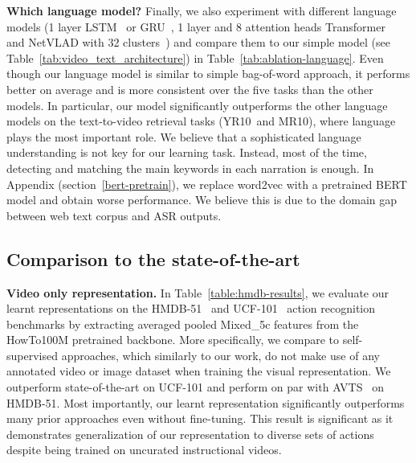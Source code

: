 \documentclass[10pt,twocolumn,letterpaper]{article}
\newcommand{\rYC}{YR10}
\newcommand{\rMSRVTT}{MR10}
\begin{document}
\noindent
\textbf{Which language model?}
Finally, we also experiment with different language models (1 layer LSTM~\cite{hochreiter97lstm} or GRU~\cite{cho11GRU}, 1 layer and 8 attention heads Transformer~\cite{vaswani2017attention} and NetVLAD with 32 clusters~\cite{arandjelovic16netvlad}) and compare them to our simple model (see Table~\ref{tab:video_text_architecture}) in Table~\ref{tab:ablation-language}.
Even though our language model is similar to simple bag-of-word approach, it performs better on average and is more consistent over the five tasks than the other models.
In particular, our model significantly outperforms the other language models on the text-to-video retrieval tasks (\rYC \ and \rMSRVTT), where language plays the most important role.
We believe that a sophisticated language understanding is not key for our learning task.
Instead, most of the time, detecting and matching the main keywords in each narration is enough.
In Appendix (section~\ref{bert-pretrain}), we replace word2vec with a pretrained BERT model and obtain worse performance. We believe this is due to the domain gap between web text corpus and ASR outputs.



\subsection{Comparison to the state-of-the-art}
\label{subsec:benchmark}

\noindent
\textbf{Video only representation.}
In Table~\ref{table:hmdb-results}, we evaluate our learnt representations on the \mbox{HMDB-51}~\cite{kuehne2011hmdb} and UCF-101~\cite{soomro2012} action recognition benchmarks by extracting averaged pooled Mixed\_5c features from the HowTo100M pretrained backbone.
More specifically, we compare to self-supervised approaches, which similarly to our work, do not make use of any annotated video or image dataset when training the visual representation.
We outperform state-of-the-art on UCF-101 and perform on par with AVTS~\cite{korbar2018cooperative} on HMDB-51.
Most importantly, our learnt representation significantly outperforms many prior approaches even without fine-tuning.
This result is significant as it demonstrates generalization of our representation to diverse sets of actions despite being trained on uncurated instructional videos.
\end{document}
